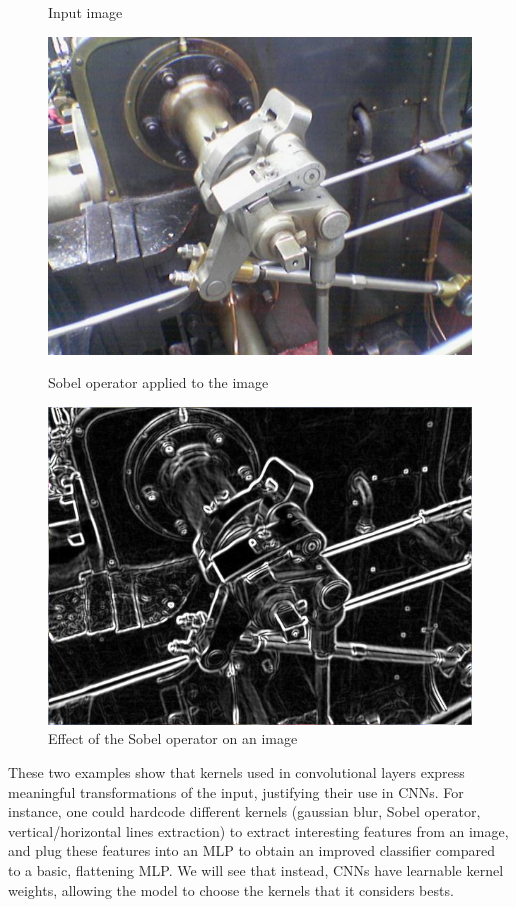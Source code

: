 \begin{example}
\begin{figure}[H]
        \begin{minipage}{0.4\textwidth}
            \centering
            \caption*{Input image}
            \includegraphics[width=.9\textwidth]{images/pre-sobel.png}
        \end{minipage}
        \begin{minipage}{0.4\textwidth}
            \centering
            \caption*{Sobel operator applied to the image}
            \includegraphics[width=.9\textwidth]{images/post-sobel.png}
        \end{minipage}
        
        \caption{Effect of the Sobel operator on an image}
    \end{figure}
\end{example}

These two examples show that kernels used in convolutional layers express meaningful transformations of the input, justifying their use in CNNs. For instance, one could hardcode different kernels (gaussian blur, Sobel operator, vertical/horizontal lines extraction) to extract interesting features from an image, and plug these features into an MLP to obtain an improved classifier compared to a basic, flattening MLP. We will see that instead, CNNs have learnable kernel weights, allowing the model to choose the kernels that it considers bests.

